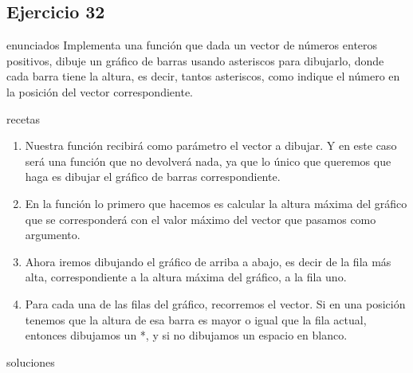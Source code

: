 \subsection{Ejercicio 32}
\def\parte{enunciados}
\ifx\capitulo\parte
Implementa una función que dada un vector de números enteros positivos, dibuje un gráfico de barras usando asteriscos para dibujarlo, donde cada barra tiene la altura, es decir, tantos asteriscos, como indique el número en la posición del vector correspondiente.
\fi

\def\parte{recetas}
\ifx\capitulo\parte
\begin{enumerate}
\item Nuestra función recibirá como parámetro el vector a dibujar. Y en este caso será una función que no devolverá nada, ya que lo único que queremos que haga es dibujar el gráfico de barras correspondiente.
\item En la función lo primero que hacemos es calcular la altura máxima del gráfico que se corresponderá con el valor máximo del vector que pasamos como argumento.
\item Ahora iremos dibujando el gráfico de arriba a abajo, es decir de la fila más alta, correspondiente a la altura máxima del gráfico, a la fila uno.
\item Para cada una de las filas del gráfico, recorremos el vector. Si en una posición tenemos que la altura de esa barra es mayor o igual que la fila actual, entonces dibujamos un *, y si no dibujamos un espacio en blanco.
\end{enumerate}
\fi

\def\parte{soluciones}
\ifx\capitulo\parte

\fi

